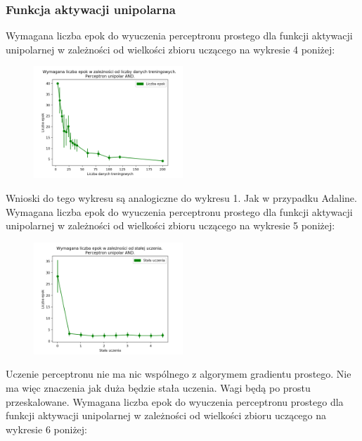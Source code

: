\documentclass{article}
\begin{document}
	\subsubsection{Funkcja aktywacji unipolarna}
	Wymagana liczba epok do wyuczenia perceptronu prostego dla funkcji aktywacji unipolarnej w zależności od wielkości zbioru uczącego na wykresie 4 poniżej:
	\begin{figure}[h]
		\centering
		\caption{}
		\includegraphics[width=0.5\textwidth]{epoki_dane_perceptron_unipolar_and.png}
	\end{figure}
	
	Wnioski do tego wykresu są analogiczne do wykresu 1. Jak w przypadku Adaline.\\[0.5cm]
	
	Wymagana liczba epok do wyuczenia perceptronu prostego dla funkcji aktywacji unipolarnej w zależności od wielkości zbioru uczącego na wykresie 5 poniżej:
	
	\begin{figure}[h]
		\centering
		\caption{}
		\includegraphics[width=0.5\textwidth]{epoki_rate_perceptron_unipolar.png}
	\end{figure}
	
	Uczenie perceptronu nie ma nic wspólnego z algorymem gradientu prostego. Nie ma więc znaczenia jak duża będzie stała uczenia. Wagi będą po prostu przeskalowane.
	\newpage
		Wymagana liczba epok do wyuczenia perceptronu prostego dla funkcji aktywacji unipolarnej w zależności od wielkości zbioru uczącego na wykresie 6 poniżej:
	
\end{document}
